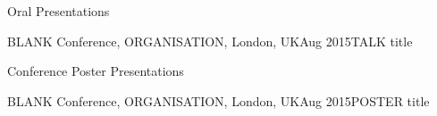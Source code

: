 \documentclass{resume} %
\begin{document}
\ifresume
\else
    
    
    \begin{rSection}{Oral Presentations}
        
        \begin{rPres}{BLANK Conference, ORGANISATION, London, UK}{Aug 2015}{TALK title}\end{rPres}
        
    \end{rSection}
    
    
    \begin{rSection}{Conference Poster Presentations}
        
        \begin{rPres}{BLANK Conference, ORGANISATION, London, UK}{Aug 2015}{POSTER title}\end{rPres}

    \end{rSection}
\fi %


\end{document}
